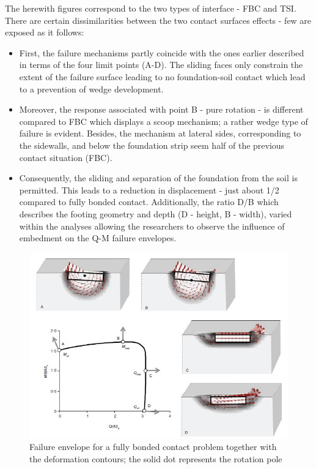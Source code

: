 \documentclass[12pt,a4paper]{report}
\begin{document}
The herewith figures correspond to the two types of interface - FBC and TSI. There are certain dissimilarities between the two contact surfaces effects - few are exposed as it follows:
\begin{itemize}
	\item First, the failure mechanisms partly coincide with the ones earlier described in terms of the four limit points (A-D). The sliding faces only constrain the extent of the failure surface leading to no foundation-soil contact which lead to a prevention of wedge development.
	\item Moreover, the response associated with point B - pure rotation - is different compared to FBC which displays a scoop mechanism; a rather wedge type of failure is evident. Besides, the mechanism at lateral sides, corresponding to the sidewalls, and below the foundation strip seem half of the previous contact situation (FBC).
	\item Consequently, the sliding and separation of the foundation from the soil is permitted. This leads to a reduction in displacement - just about 1/2 compared to fully bonded contact. Additionally, the ratio D/B which describes the footing geometry and depth (D - height, B - width), varied within the analyses allowing the researchers to observe the influence of embedment on the Q-M failure envelopes. 
\end{itemize}

\begin{figure}[h!]
	\centering
	\includegraphics[width=0.8\linewidth]{"fbc_contour"}
	\caption{Failure envelope for a fully bonded contact problem together with the deformation contours; the solid dot represents the rotation pole}
	\label{contour}
\end{figure}
\end{document}
